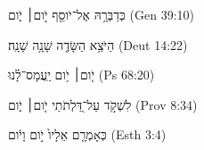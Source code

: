 
\begin{exe}

\ex\label{regrec_distr_exs1}
\texthebrew{
כְּדַבְּרָ֥הּ אֶל־יֹוסֵ֖ף יֹ֣ום׀ יֹ֑ום 
} (Gen 39:10)

\ex\label{regrec_distr_exs2}
\texthebrew{
הַיֹּצֵ֥א הַשָּׂדֶ֖ה שָׁנָ֥ה שָׁנָֽה׃ 
} (Deut 14:22)

\ex\label{regrec_distr_exs3}
\texthebrew{
יֹ֤ום׀ יֹ֥ום יַֽעֲמָס־לָ֗נוּ 
} (Ps 68:20)

\ex\label{regrec_distr_exs4}
\texthebrew{
לִשְׁקֹ֣ד עַל־דַּ֭לְתֹתַי יֹ֤ום׀ יֹ֑ום 
} (Prov 8:34)

\ex\label{regrec_distr_exs5}
\texthebrew{
כְּאָמְרָ֤ם אֵלָיו֙ יֹ֣ום וָיֹ֔ום 
} (Esth 3:4)

\end{exe}
